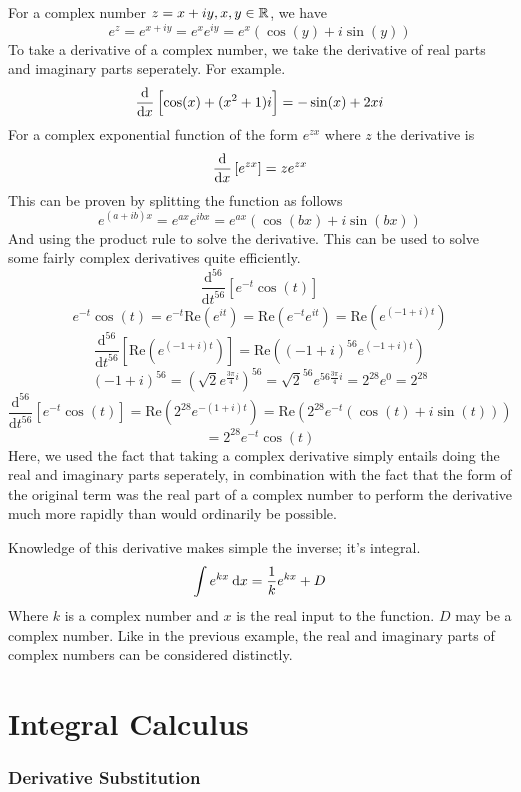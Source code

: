 \documentclass[12pt]{report}
\begin{document}
\begin{flushleft}
For a complex number \(z = x + iy, x, y \in \mathbb{R}\), we have
\[e^z = e^{x + iy} = e^xe^{iy} = e^x(\cos(y) + i\sin(y))\]
To take a derivative of a complex number, we take the derivative of real parts
and imaginary parts seperately. For example.
\[\frac{\mathrm{d}}{\mathrm{d}x}\left[\cos(x) + (x^2 + 1)i\right] = -\sin(x) + 2xi\]
For a complex exponential function of the form \(e^{zx}\) where \(z\) the 
derivative is
\[\frac{\mathrm{d}}{\mathrm{d}x}\left[e^{zx}\right] = ze^{zx}\]
This can be proven by splitting the function as follows
\[e^{(a + ib)x} = e^{ax}e^{ibx} = e^{ax}(\cos(bx) + i\sin(bx))\]
And using the product rule to solve the derivative. This can be used to solve
some fairly complex derivatives quite efficiently.
\[\frac{\mathrm{d}^{56}}{\mathrm{d}t^{56}}\left[e^{-t}\cos(t)\right]\]
\[e^{-t}\cos(t) = e^{-t}\mathrm{Re}\left(e^{it}\right) = 
\mathrm{Re}\left(e^{-t}e^{it}\right) = \mathrm{Re}\left(e^{(-1 + i)t}\right)\]
\[\frac{\mathrm{d}^{56}}{\mathrm{d}t^{56}}\left[\mathrm{Re}
\left(e^{(-1 + i)t}\right)\right] = 
\mathrm{Re}\left((-1 + i)^{56}e^{(-1 + i)t}\right)\]
\[\left(-1 + i\right)^{56} = \left(\sqrt{2}e^{\frac{3\pi}{4}i}\right)^{56}
= \sqrt{2}^{56}e^{56\frac{3\pi}{4}i} = 2^{28}e^{0} = 2^{28}\]
\[\frac{\mathrm{d}^{56}}{\mathrm{d}t^{56}}\left[e^{-t}\cos(t)\right] = 
\mathrm{Re}\left(2^{28}e^{-(1 + i)t}\right) = 
\mathrm{Re}\left(2^{28}e^{-t}(\cos(t) + i\sin(t))\right) \]
\[= 2^{28}e^{-t}\cos(t)\]
Here, we used the fact that taking a complex derivative simply entails doing
the real and imaginary parts seperately, in combination with the fact that the
form of the original term was the real part of a complex number to perform the
derivative much more rapidly than would ordinarily be possible. \par
Knowledge of this derivative makes simple the inverse; it's integral.
\[\int e^{kx} \:\mathrm{d}x = \frac{1}{k}e^{kx} + D\]
Where \(k\) is a complex number and \(x\) is the real input to the function.
\(D\) may be a complex number. Like in the previous example, the real and 
imaginary parts of complex numbers can be considered distinctly.

\section*{Integral Calculus}

\subsubsection*{Derivative Substitution}


\end{flushleft}
\end{document}

